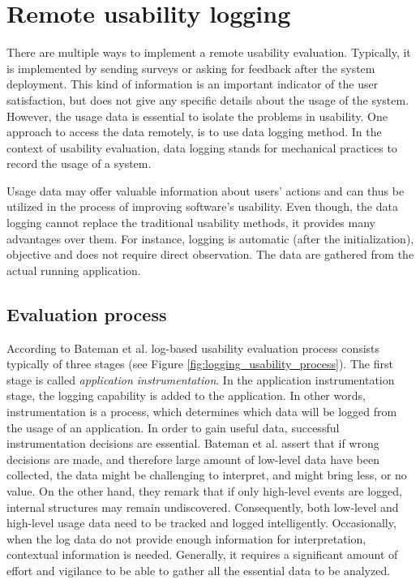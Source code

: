 \documentclass[12pt,a4paper,oneside,pdftex]{report}
\begin{document}
\section{Remote usability logging}
\label{sec:rue}

There are multiple ways to implement a remote usability evaluation. Typically, it is implemented by sending surveys or asking for feedback after the system deployment. This kind of information is an important indicator of the user satisfaction, but does not give any specific details about the usage of the system. However, the usage data is essential to isolate the problems in usability. One approach to access the data remotely, is to use data logging method. In the context of usability evaluation, data logging stands for mechanical practices to record the usage of a system. \citep{RefWorks:31}

Usage data may offer valuable information about users' actions and can thus be utilized in the process of improving software's usability. Even though, the data logging cannot replace the traditional usability methods, it provides many advantages over them. For instance, logging is automatic (after the initialization), objective and does not require direct observation. The data are gathered from the actual running application. \citep{RefWorks:24}	


\subsection{Evaluation process} 

According to Bateman et al. \citep{RefWorks:24} log-based usability evaluation process consists typically of three stages (see Figure \ref{fig:logging_usability_process}). The first stage is called \emph{application instrumentation}. In the application instrumentation stage, the logging capability is added to the application. In other words, instrumentation is a process, which determines which data will be logged from the usage of an application. In order to gain useful data, successful instrumentation decisions are essential. Bateman et al. assert that if wrong decisions are made, and therefore large amount of low-level data have been collected, the data might be challenging to interpret, and might bring less, or no value. On the other hand, they remark that if only high-level events are logged, internal structures may remain undiscovered. Consequently, both low-level and high-level usage data need to be tracked and logged intelligently. Occasionally, when the log data do not provide enough information for interpretation, contextual information is needed. Generally, it requires a significant amount of effort and vigilance to be able to gather all the essential data to be analyzed. \citep{RefWorks:24}
\end{document}

